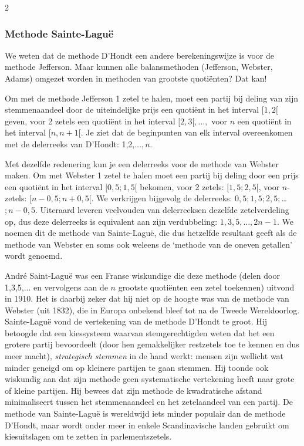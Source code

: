 \begin{multicols}{2}
\subsubsection{Methode Sainte-Laguë}
We weten dat de methode D'Hondt een andere berekeningswijze is voor de methode Jefferson. Maar kunnen alle balansmethoden (Jefferson, Webster, Adams) omgezet worden in methoden van grootste quotiënten? Dat kan!

Om met de methode Jefferson 1 zetel te halen, moet een partij bij deling van zijn stemmenaandeel door de uiteindelijke prijs een quotiënt in het interval $[1,2[$ geven, voor 2 zetels een quotiënt in het interval $[2,3[,\ldots,$ voor $n$ een quotiënt in het interval $[n,n+1[$. Je ziet dat de beginpunten van elk interval overeenkomen met de delerreeks van D'Hondt: 1,2,$\ldots,n$.

Met dezelfde redenering kun je een delerreeks voor de methode van Webster maken. Om met Webster 1 zetel te halen moet een partij bij deling door een prijs een quotiënt in het interval $[0,5;1,5[$ bekomen, voor 2 zetels: $[1,5;2,5[$, voor $n$-zetels: $[n-0,5;n+0,5[$. We verkrijgen bijgevolg de delerreeks: $0,5; 1,5; 2,5;$\ldots$;n-0,5$. Uiteraard leveren veelvouden van delerreeksen dezelfde zetelverdeling op, dus deze delerreeks is equivalent aan zijn verdubbeling: $1, 3, 5,\ldots, 2n-1$. We noemen dit de methode van Sainte-Laguë, die dus hetzelfde resultaat geeft als de methode van Webster en soms ook weleens de `methode van de oneven getallen' wordt genoemd. 

André Saint-Laguë was een Franse wiskundige die deze methode (delen door 1,3,5,... en vervolgens aan de $n$ grootste quotiënten een zetel toekennen) uitvond in 1910. Het is daarbij zeker dat hij niet op de hoogte was van de methode van Webster (uit 1832), die in Europa onbekend bleef tot na de Tweede Wereldoorlog. Sainte-Laguë vond  de vertekening van de methode D'Hondt te groot. Hij betoogde dat een kiessysteem waarvan stemgerechtigden weten dat het een grotere partij bevoordeelt (door hen gemakkelijker restzetels toe te kennen en dus meer macht), \textit{strategisch stemmen} in de hand werkt: mensen zijn wellicht wat minder geneigd om op kleinere partijen te gaan stemmen. Hij toonde ook wiskundig aan dat zijn methode geen systematische vertekening heeft naar grote of kleine partijen. Hij bewees dat zijn methode 
de kwadratische afstand minimaliseert tussen het stemmenaandeel en het zetelaandeel van een partij. De methode van Sainte-Laguë is wereldwijd iets minder populair dan de methode D'Hondt, maar wordt onder meer in enkele Scandinavische landen gebruikt om kiesuitslagen om te zetten in parlementszetels.


\end{multicols}
